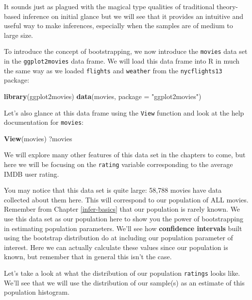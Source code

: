 \documentclass[]{tufte-book}
\newenvironment{Shaded}{\begin{snugshade}}{\end{snugshade}}
\newcommand{\KeywordTok}[1]{\textcolor[rgb]{0.13,0.29,0.53}{\textbf{{#1}}}}
\newcommand{\DataTypeTok}[1]{\textcolor[rgb]{0.13,0.29,0.53}{{#1}}}
\newcommand{\StringTok}[1]{\textcolor[rgb]{0.31,0.60,0.02}{{#1}}}
\newcommand{\NormalTok}[1]{{#1}}
\begin{document}
It sounds just as plagued with the magical type qualities of traditional
theory-based inference on initial glance but we will see that it
provides an intuitive and useful way to make inferences, especially when
the samples are of medium to large size.

To introduce the concept of bootstrapping, we now introduce the
\texttt{movies} data set in the \texttt{ggplot2movies} data frame. We
will load this data frame into R in much the same way as we loaded
\texttt{flights} and \texttt{weather} from the \texttt{nycflights13}
package:

\begin{Shaded}
\begin{Highlighting}[]
\KeywordTok{library}\NormalTok{(ggplot2movies)}
\KeywordTok{data}\NormalTok{(movies, }\DataTypeTok{package =} \StringTok{"ggplot2movies"}\NormalTok{)}
\end{Highlighting}
\end{Shaded}

Let's also glance at this data frame using the \texttt{View} function
and look at the help documentation for \texttt{movies}:

\begin{Shaded}
\begin{Highlighting}[]
\KeywordTok{View}\NormalTok{(movies)}
\NormalTok{?movies}
\end{Highlighting}
\end{Shaded}

We will explore many other features of this data set in the chapters to
come, but here we will be focusing on the \texttt{rating} variable
corresponding to the average IMDB user rating.

You may notice that this data set is quite large: 58,788 movies have
data collected about them here. This will correspond to our population
of ALL movies. Remember from Chapter \ref{infer-basics} that our
population is rarely known. We use this data set as our population here
to show you the power of bootstrapping in estimating population
parameters. We'll see how \textbf{confidence intervals} built using the
bootstrap distribution do at including our population parameter of
interest. Here we can actually calculate these values since our
population is known, but remember that in general this isn't the case.

Let's take a look at what the distribution of our population
\texttt{ratings} looks like. We'll see that we will use the distribution
of our sample(s) as an estimate of this population histogram.
\end{document}
